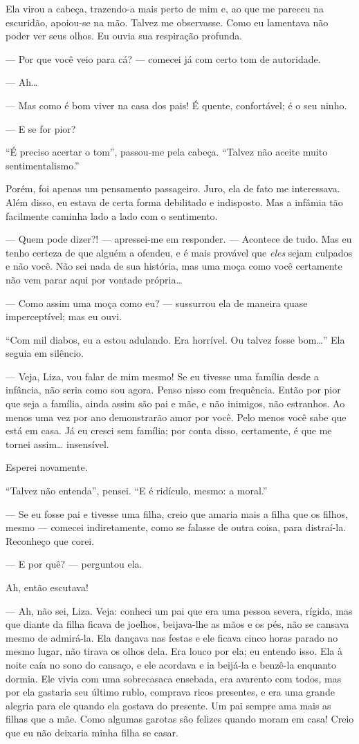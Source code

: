 Ela virou a cabeça, trazendo-a mais perto de mim e, ao que me pareceu na
escuridão, apoiou-se na mão. Talvez me observasse. Como eu lamentava
não poder ver seus olhos. Eu ouvia sua respiração profunda.

--- Por que você veio para cá? --- comecei já com certo tom de autoridade.

--- Ah\ldots{}

--- Mas como é bom viver na casa dos pais! É quente, confortável; é o seu
ninho.

--- E se for pior?

“É preciso acertar o tom”, passou-me pela cabeça. “Talvez não aceite
muito sentimentalismo.”

Porém, foi apenas um pensamento passageiro. Juro, ela de fato me
interessava. Além disso, eu estava de certa forma debilitado e
indisposto. Mas a infâmia tão facilmente caminha lado a lado com o
sentimento.

--- Quem pode dizer?! --- apressei{}-me em responder. --- Acontece de tudo.
Mas eu tenho certeza de que alguém a ofendeu, e é mais provável que
\textit{eles} sejam culpados e não você. Não sei nada de sua história,
mas uma moça como você certamente não vem parar aqui por vontade
própria\ldots{}

--- Como assim uma moça como eu? --- sussurrou ela de maneira quase
imperceptível; mas eu ouvi.

“Com mil diabos, eu a estou adulando. Era horrível. Ou talvez fosse
bom\ldots{}” Ela seguia em silêncio.

--- Veja, Liza, vou falar de mim mesmo! Se eu tivesse uma família desde a
infância, não seria como sou agora. Penso nisso com frequência. Então
por pior que seja a família, ainda assim são pai e mãe, e não inimigos,
não estranhos. Ao menos uma vez por ano demonstrarão amor por você.
Pelo menos você sabe que está em casa. Já eu cresci sem família; por
conta disso, certamente, é que me tornei assim\ldots{} insensível.

Esperei novamente.

“Talvez não entenda”, pensei. “E é ridículo, mesmo: a moral.”

--- Se eu fosse pai e tivesse uma filha, creio que amaria mais a filha que
os filhos, mesmo --- comecei indiretamente, como se falasse de outra
coisa, para distraí-la. Reconheço que corei.

--- E por quê? --- perguntou ela.

Ah, então escutava!

--- Ah, não sei, Liza. Veja: conheci um pai que era uma pessoa severa,
rígida, mas que diante da filha ficava de joelhos, beijava-lhe as mãos
e os pés, não se cansava mesmo de admirá-la. Ela dançava nas festas e
ele ficava cinco horas parado no mesmo lugar, não tirava os olhos dela.
Era louco por ela; eu entendo isso. Ela à noite caía no sono do
cansaço, e ele acordava e ia beijá-la e benzê-la enquanto dormia. Ele
vivia com uma sobrecasaca ensebada, era avarento com todos, mas por ela
gastaria seu último rublo, comprava ricos presentes, e era uma grande
alegria para ele quando ela gostava do presente. Um pai sempre ama mais
as filhas que a mãe. Como algumas garotas são felizes quando moram em
casa! Creio que eu não deixaria minha filha se casar.

